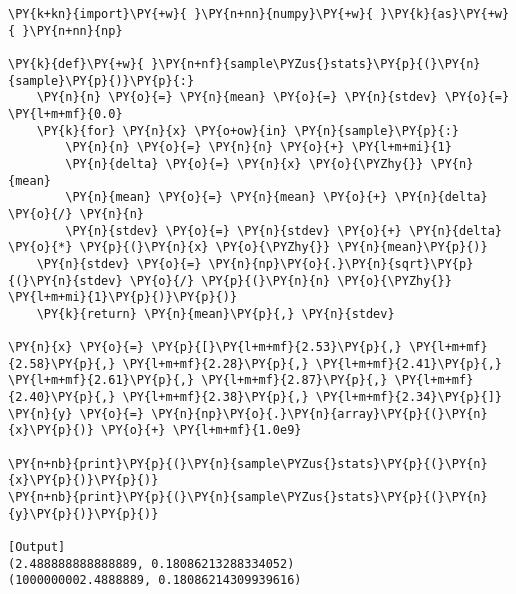\begin{Verbatim}[label=\makebox{\href{https://github.com/unipi-physics-labs/statnotes/tree/main/snippy/sample_stat_welford.py}{https://github.com/.../sample\_stat\_welford.py}},commandchars=\\\{\}]
\PY{k+kn}{import}\PY{+w}{ }\PY{n+nn}{numpy}\PY{+w}{ }\PY{k}{as}\PY{+w}{ }\PY{n+nn}{np}

\PY{k}{def}\PY{+w}{ }\PY{n+nf}{sample\PYZus{}stats}\PY{p}{(}\PY{n}{sample}\PY{p}{)}\PY{p}{:}
    \PY{n}{n} \PY{o}{=} \PY{n}{mean} \PY{o}{=} \PY{n}{stdev} \PY{o}{=} \PY{l+m+mf}{0.0}
    \PY{k}{for} \PY{n}{x} \PY{o+ow}{in} \PY{n}{sample}\PY{p}{:}
        \PY{n}{n} \PY{o}{=} \PY{n}{n} \PY{o}{+} \PY{l+m+mi}{1}
        \PY{n}{delta} \PY{o}{=} \PY{n}{x} \PY{o}{\PYZhy{}} \PY{n}{mean}
        \PY{n}{mean} \PY{o}{=} \PY{n}{mean} \PY{o}{+} \PY{n}{delta} \PY{o}{/} \PY{n}{n}
        \PY{n}{stdev} \PY{o}{=} \PY{n}{stdev} \PY{o}{+} \PY{n}{delta} \PY{o}{*} \PY{p}{(}\PY{n}{x} \PY{o}{\PYZhy{}} \PY{n}{mean}\PY{p}{)}
    \PY{n}{stdev} \PY{o}{=} \PY{n}{np}\PY{o}{.}\PY{n}{sqrt}\PY{p}{(}\PY{n}{stdev} \PY{o}{/} \PY{p}{(}\PY{n}{n} \PY{o}{\PYZhy{}} \PY{l+m+mi}{1}\PY{p}{)}\PY{p}{)}
    \PY{k}{return} \PY{n}{mean}\PY{p}{,} \PY{n}{stdev}

\PY{n}{x} \PY{o}{=} \PY{p}{[}\PY{l+m+mf}{2.53}\PY{p}{,} \PY{l+m+mf}{2.58}\PY{p}{,} \PY{l+m+mf}{2.28}\PY{p}{,} \PY{l+m+mf}{2.41}\PY{p}{,} \PY{l+m+mf}{2.61}\PY{p}{,} \PY{l+m+mf}{2.87}\PY{p}{,} \PY{l+m+mf}{2.40}\PY{p}{,} \PY{l+m+mf}{2.38}\PY{p}{,} \PY{l+m+mf}{2.34}\PY{p}{]}
\PY{n}{y} \PY{o}{=} \PY{n}{np}\PY{o}{.}\PY{n}{array}\PY{p}{(}\PY{n}{x}\PY{p}{)} \PY{o}{+} \PY{l+m+mf}{1.0e9}

\PY{n+nb}{print}\PY{p}{(}\PY{n}{sample\PYZus{}stats}\PY{p}{(}\PY{n}{x}\PY{p}{)}\PY{p}{)}
\PY{n+nb}{print}\PY{p}{(}\PY{n}{sample\PYZus{}stats}\PY{p}{(}\PY{n}{y}\PY{p}{)}\PY{p}{)}

[Output]
(2.488888888888889, 0.18086213288334052)
(1000000002.4888889, 0.18086214309939616)
\end{Verbatim}
